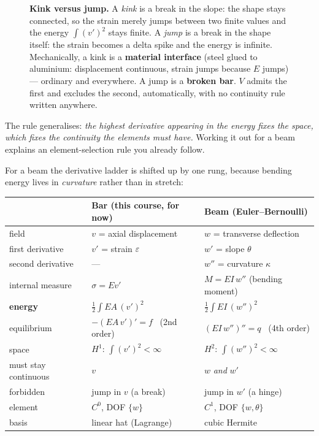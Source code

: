 \begin{figure}[htbp]
\begin{tikzpicture}[scale=0.92, every node/.style={font=\small}]
\end{tikzpicture}

\caption{\textbf{Kink versus jump.} A \emph{kink} is a break in the slope: the
shape stays connected, so the strain merely jumps between two finite values and
the energy $\int(v')^{2}$ stays finite. A \emph{jump} is a break in the shape
itself: the strain becomes a delta spike and the energy is infinite.
Mechanically, a kink is a \textbf{material interface} (steel glued to
aluminium: displacement continuous, strain jumps because $E$ jumps) --- ordinary
and everywhere. A jump is a \textbf{broken bar}. $V$ admits the first and
excludes the second, automatically, with no continuity rule written
anywhere.}
\label{fig:kinkjump}
\end{figure}
\fi

\begin{mechanics}
The rule generalises: \emph{the highest derivative appearing in the energy
fixes the space, which fixes the continuity the elements must have.} Working it
out for a beam explains an element-selection rule you already follow.

For a beam the derivative ladder is shifted up by one rung, because bending
energy lives in \emph{curvature} rather than in stretch:

\begin{center}\small
\renewcommand{\arraystretch}{1.2}
\begin{tabular}{@{}l l l@{}}
\toprule
 & \textbf{Bar (this course, for now)} & \textbf{Beam (Euler--Bernoulli)}\\
\midrule
field                & $v$ = axial displacement      & $w$ = transverse deflection\\
first derivative     & $v'$ = strain $\varepsilon$          & $w'$ = slope $\theta$\\
second derivative    & ---                            & $w''$ = curvature $\kappa$\\
internal measure     & $\sigma = E v'$                & $M = EI\,w''$ (bending moment)\\
\textbf{energy}      & $\tfrac12\int EA\,(v')^{2}$    & $\tfrac12\int EI\,(w'')^{2}$\\
equilibrium          & $-(EA\,v')' = f$ \ (2nd order) & $(EI\,w'')'' = q$ \ (4th order)\\
space                & $H^{1}$: $\int (v')^{2}<\infty$ & $H^{2}$: $\int (w'')^{2}<\infty$\\
must stay continuous & $v$                            & $w$ \emph{and} $w'$\\
forbidden            & jump in $v$ (a break)          & jump in $w'$ (a hinge)\\
element              & $C^{0}$, DOF $\{w\}$           & $C^{1}$, DOF $\{w,\theta\}$\\
basis                & linear hat (Lagrange)          & cubic Hermite\\
\bottomrule
\end{tabular}
\end{center}


\end{mechanics}
